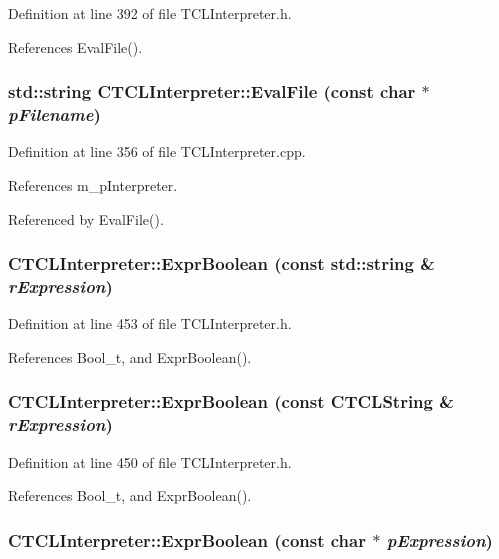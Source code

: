 Definition at line 392 of file TCLInterpreter.h.

References Eval\-File().
\subsubsection{\setlength{\rightskip}{0pt plus 5cm}std::string CTCLInterpreter::Eval\-File (const char $\ast$ {\em p\-Filename})}\label{classCTCLInterpreter_a8}




Definition at line 356 of file TCLInterpreter.cpp.

References m\_\-p\-Interpreter.

Referenced by Eval\-File().
\subsubsection{ CTCLInterpreter::Expr\-Boolean (const std::string \& {\em r\-Expression})\hspace{0.3cm}{\tt  [inline]}}\label{classCTCLInterpreter_a28}




Definition at line 453 of file TCLInterpreter.h.

References Bool\_\-t, and Expr\-Boolean().
\subsubsection{ CTCLInterpreter::Expr\-Boolean (const {\bf CTCLString} \& {\em r\-Expression})\hspace{0.3cm}{\tt  [inline]}}\label{classCTCLInterpreter_a27}




Definition at line 450 of file TCLInterpreter.h.

References Bool\_\-t, and Expr\-Boolean().
\subsubsection{ CTCLInterpreter::Expr\-Boolean (const char $\ast$ {\em p\-Expression})}\label{classCTCLInterpreter_a26}




